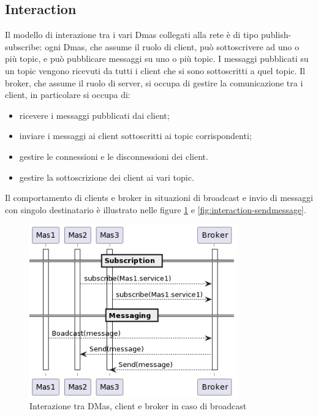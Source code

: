 \subsection{Interaction}
Il modello di interazione tra i vari Dmas collegati alla rete è di tipo publish-subscribe: ogni Dmas, che assume il ruolo di client, può sottoscrivere ad uno o più topic, e può pubblicare messaggi su uno o più topic.
I messaggi pubblicati su un topic vengono ricevuti da tutti i client che si sono sottoscritti a quel topic.
Il broker, che assume il ruolo di server, si occupa di gestire la comunicazione tra i client, in particolare si occupa di:
\begin{itemize}
    \item ricevere i messaggi pubblicati dai client;
    \item inviare i messaggi ai client sottoscritti ai topic corrispondenti;
    \item gestire le connessioni e le disconnessioni dei client.
    \item gestire la sottoscrizione dei client ai vari topic.
\end{itemize}

Il comportamento di clients e broker in situazioni di broadcast e invio di messaggi con singolo destinatario è illustrato nelle figure \ref{fig:interaction-broadcast} e \ref{fig:interaction-sendmessage}.

\begin{figure}[ht!]
    \centering
    \includegraphics[width=0.8\textwidth]{figures/interaction-broadcast.png}
    \caption{Interazione tra DMas, client e broker in caso di broadcast}
    \label{fig:interaction-broadcast}
\end{figure}

